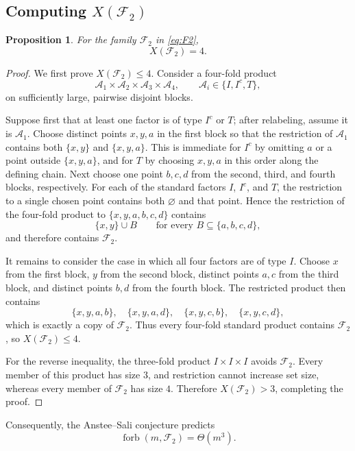 \documentclass[11pt]{article}
\newtheorem{proposition}[theorem]{Proposition}
\theoremstyle{definition}
\newcommand{\forb}{\operatorname{forb}}
\newcommand{\cF}{\mathcal F}
\begin{document}
	\subsection{\texorpdfstring{Computing $X(\cF_2)$}{Computing X(F2)}}
	
	\begin{proposition}\label{prop:X4}
		For the family $\cF_2$ in \eqref{eq:F2},
		\[
		X(\cF_2)=4.
		\]
	\end{proposition}
	
	\begin{proof}
		We first prove $X(\cF_2)\le 4$. Consider a four-fold product
		\[
		\mathcal A_1\times\mathcal A_2\times\mathcal A_3\times\mathcal A_4,
		\qquad
		\mathcal A_i\in\{I,I^c,T\},
		\]
		on sufficiently large, pairwise disjoint blocks.
		
		Suppose first that at least one factor is of type $I^c$ or $T$; after
		relabeling, assume it is $\mathcal A_1$. Choose distinct points
		$x,y,a$ in the first block so that the restriction of $\mathcal A_1$ contains
		both $\{x,y\}$ and $\{x,y,a\}$. This is immediate for $I^c$ by omitting $a$
		or a point outside $\{x,y,a\}$, and for $T$ by choosing $x,y,a$ in this order
		along the defining chain. Next choose one point $b,c,d$ from the second,
		third, and fourth blocks, respectively. For each of the standard factors
		$I$, $I^c$, and $T$, the restriction to a single chosen point contains both
		$\varnothing$ and that point. Hence the restriction of the four-fold product
		to $\{x,y,a,b,c,d\}$ contains
		\[
		\{x,y\}\cup B
		\qquad\text{for every }B\subseteq\{a,b,c,d\},
		\]
		and therefore contains $\cF_2$.
		
		It remains to consider the case in which all four factors are of type $I$.
		Choose $x$ from the first block, $y$ from the second block, distinct points
		$a,c$ from the third block, and distinct points $b,d$ from the fourth block.
		The restricted product then contains
		\[
		\{x,y,a,b\},\quad
		\{x,y,a,d\},\quad
		\{x,y,c,b\},\quad
		\{x,y,c,d\},
		\]
		which is exactly a copy of $\cF_2$. Thus every four-fold standard product
		contains $\cF_2$, so $X(\cF_2)\le 4$.
		
		For the reverse inequality, the three-fold product $I\times I\times I$
		avoids $\cF_2$. Every member of this product has size $3$, and restriction
		cannot increase set size, whereas every member of $\cF_2$ has size $4$.
		Therefore $X(\cF_2)>3$, completing the proof.
	\end{proof}
	
	Consequently, the Anstee--Sali conjecture predicts
	\begin{equation}\label{eq:predictionF2}
		\forb(m,\cF_2)=\Theta(m^3).
	\end{equation}
	
\end{document}
